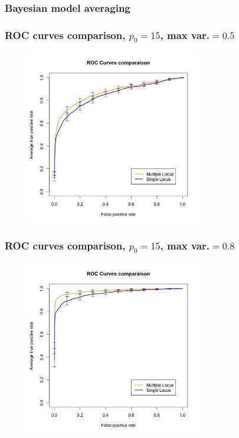 \documentclass{beamer}
\begin{document}
\begin{frame}
\frametitle{Bayesian model averaging}

\end{frame}



















\begin{frame}
\frametitle{ROC curves comparison, $p_0 = 15$, max var.$=0.5$}
\begin{figure}
\includegraphics[width=3in]{images/ROC_Comp_p0_15_var_0_5.jpeg}
\end{figure}
\end{frame}
\begin{frame}
\frametitle{ROC curves comparison, $p_0 = 15$, max var.$=0.8$}
\begin{figure}
\includegraphics[width=3in]{images/ROC_Comp_p0_15_var_0_8.jpeg}
\end{figure}
\end{frame}
\end{document}
